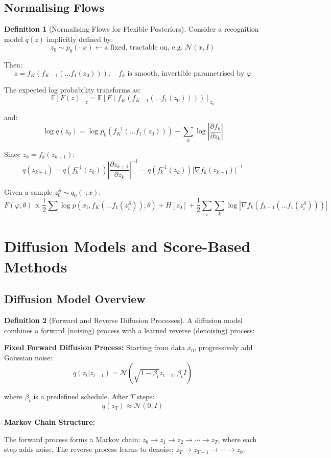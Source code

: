 \documentclass[12pt,a4paper]{article}
\theoremstyle{definition}
\newtheorem{definition}{Definition}[section]
\begin{document}
\subsection{Normalising Flows}

\begin{definition}[Normalising Flows for Flexible Posteriors]
Consider a recognition model $q(z)$ implicitly defined by:
\[
z_0 \sim p_0(\cdot|x) \leftarrow \text{a fixed, tractable on, e.g. } \mathcal{N}(x, I)
\]

Then:
\[
z = f_K(f_{K-1}(\ldots f_1(z_0))), \quad f_k \text{ is smooth, invertible parametrised by } \varphi
\]

The expected log probability transforms as:
\[
\mathbb{E}[F(z)]_{z} = \mathbb{E}[F(f_K(f_{K-1}(\ldots f_1(z_0))))]_{z_0}
\]

and:
\[
\log q(z_0) = \log p_0(f_K^{-1}(\ldots f_1(z_0))) - \sum_k \log \left| \frac{\partial f_k}{\partial z_k} \right|
\]

Since $z_k = f_k(z_{k-1})$:
\[
q(z_{k+1}) = q(f_k^{-1}(z_k)) \left| \frac{\partial z_{k+1}}{\partial z_k} \right|^{-1} = q(f_k^{-1}(z_k)) |\nabla f_k(z_{k-1})|^{-1}
\]

Given a sample $z_0^S \sim q_0(\cdot; x)$:
\[
F(\varphi, \theta) \propto \frac{1}{2} \sum \log p(x_i, f_K(\ldots f_1(z_i^S)); \theta) + H[z_0] + \frac{1}{2} \sum_i \sum_k \log |\nabla f_k(f_{k-1}(\ldots f_1(z_i^S)))|
\]
\end{definition}

\newpage

\section{Diffusion Models and Score-Based Methods}

\subsection{Diffusion Model Overview}

\begin{definition}[Forward and Reverse Diffusion Processes]
A diffusion model combines a forward (noising) process with a learned reverse (denoising) process:

\textbf{Fixed Forward Diffusion Process:}
Starting from data $x_0$, progressively add Gaussian noise:
\[
q(z_t | z_{t-1}) = \mathcal{N}(\sqrt{1-\beta_t} z_{t-1}, \beta_t I)
\]

where $\beta_t$ is a predefined schedule. After $T$ steps:
\[
q(z_T) \approx \mathcal{N}(0, I)
\]

\textbf{Markov Chain Structure:}

The forward process forms a Markov chain: $z_0 \to z_1 \to z_2 \to \cdots \to z_T$, where each step adds noise. The reverse process learns to denoise: $z_T \to z_{T-1} \to \cdots \to z_0$.
\end{definition}
\end{document}

